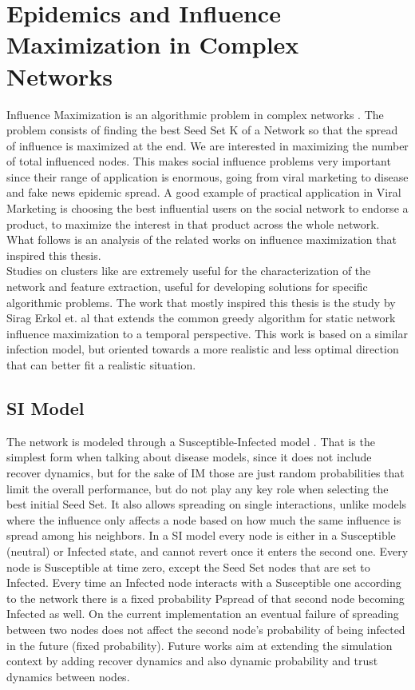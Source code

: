 \chapter{Epidemics and Influence Maximization in Complex Networks}
\label{cha:2}
Influence Maximization is an algorithmic problem in complex networks \cite{SINGH20227570}. The problem consists of finding the best Seed Set K of a Network so that the spread of influence is maximized at the end. We are interested in maximizing the number of total influenced nodes.
This makes social influence problems very important since their range of application is enormous, going from viral marketing to disease and fake news epidemic spread. A good example of practical application in Viral Marketing is choosing the best influential users on the social network to endorse a product, to maximize the interest in that product across the whole network. What follows is an analysis of the related works on influence maximization that inspired this thesis. \\
Studies on clusters like \cite{articl2e} are extremely useful for the characterization of the network and feature extraction, useful for developing solutions for specific algorithmic problems. The work that mostly inspired this thesis is the study by Sirag Erkol et. al \cite{unknown} that extends the common greedy algorithm for static network influence maximization to a temporal perspective. This work is based on a similar infection model, but oriented towards a more realistic and less optimal direction that can better fit a realistic situation.
\\
 
\section{SI Model}
\label{sec:si}
The network is modeled through a Susceptible-Infected model
\cite{MORE2019102}. That is the simplest form when talking about disease models, since it does not include recover dynamics, but for the sake of IM those are just random probabilities that limit the overall performance, but do not play any key role when selecting the best initial Seed Set. It also allows spreading on single interactions, unlike models where the influence only affects a node based on how much the same influence is spread among his neighbors.
In a SI model every node is either in a Susceptible (neutral) or Infected state, and cannot revert once it enters the second one. Every node is Susceptible at time zero, except the Seed Set nodes that are set to Infected. Every time an Infected node interacts with a Susceptible one according to the network there is a fixed probability Pspread of that second node becoming Infected as well. On the current implementation an eventual failure of spreading between two nodes does not affect the second node's probability of being infected in the future (fixed probability).
Future works aim at extending the simulation context by adding recover dynamics and also dynamic probability and trust dynamics between nodes.

